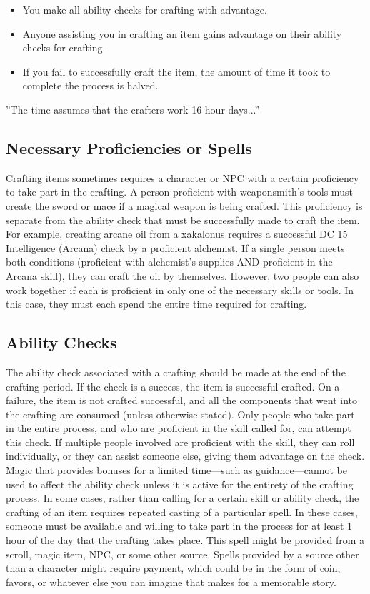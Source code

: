 \documentclass[10pt,a4paper,twoside,twocolumn,openany,bg=print,nodeprecatedcode]{dndbook}
\begin{document}
\begin{itemize}
\item You make all ability checks for crafting with advantage.
\item Anyone assisting you in crafting an item gains advantage on their ability checks for crafting.
\item If you fail to successfully craft the item, the amount of time it took to complete the process is halved.
\end{itemize}

\DndQuote%
{}
{''The time assumes that the crafters work 16-hour days...''}
{}
\subsection{Necessary Proficiencies or Spells}
Crafting items sometimes requires a character or NPC with a certain proficiency to take part in the crafting. A person proficient with weaponsmith's tools must create the sword or mace if a magical weapon is being crafted. This proficiency is separate from the ability check that must be successfully made to craft the item.
For example, creating arcane oil from a xakalonus requires a successful DC 15 Intelligence (Arcana) check by a proficient alchemist. If a single person meets both conditions (proficient with alchemist's supplies AND proficient in the Arcana skill), they can craft the oil by themselves. However, two people can also work together if each is proficient in only one of the necessary skills or tools. In this case, they must each spend the entire time required for crafting.
\subsection{Ability Checks}
The ability check associated with a crafting should be made at the end of the crafting period. If the check is a success, the item is successful crafted. On a failure, the item is not crafted successful, and all the components that went into the crafting are consumed (unless otherwise stated).
Only people who take part in the entire process, and who are proficient in the skill called for, can attempt this check. If multiple people involved are proficient with the skill, they can roll individually, or they can assist someone else, giving them advantage on the check.
Magic that provides bonuses for a limited time—such as guidance—cannot be used to affect the ability check unless it is active for the entirety of the crafting process.
In some cases, rather than calling for a certain skill or ability check, the crafting of an item requires repeated casting of a particular spell. In these cases, someone must be available and willing to take part in the process for at least 1 hour of the day that the crafting takes place. This spell might be provided from a scroll, magic item, NPC, or some other source. Spells provided by a source other than a character might require payment, which could be in the form of coin, favors, or whatever else you can imagine that makes for a memorable story.
\end{document}
